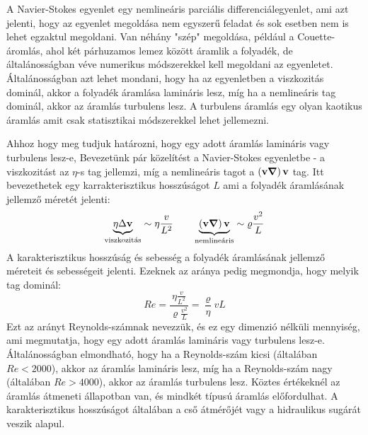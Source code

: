 \documentclass[../main.tex]{subfiles}
\begin{document}
A Navier-Stokes egyenlet egy nemlineáris parciális differenciálegyenlet, ami azt jelenti, hogy az egyenlet megoldása nem egyszerű feladat és sok esetben nem is lehet egzaktul megoldani.
Van néhány "szép" megoldása, például a Couette-áromlás, ahol két párhuzamos lemez között áramlik a folyadék, de általánosságban véve numerikus módszerekkel kell megoldani az egyenletet.
Általánosságban azt lehet mondani, hogy ha az egyenletben a viszkozitás dominál, akkor a folyadék áramlása lamináris lesz, míg ha a nemlineáris tag dominál, akkor az áramlás turbulens lesz.
A turbulens áramlás egy olyan kaotikus áramlás amit csak statisztikai módszerekkel lehet jellemezni. 

Ahhoz hogy meg tudjuk határozni, hogy egy adott áramlás lamináris vagy turbulens lesz-e,
Bevezetünk pár közelítést a Navier-Stokes egyenletbe - a viszkozitást az $\eta$-s tag jellemzi, míg a nemlineáris tagot a $\left(\bold{v} \boldsymbol{\nabla}\right)\bold{v}$ tag.
Itt bevezethetek egy karrakterisztikus hosszúságot $L$ ami a folyadék áramlásának jellemző méretét jelenti:
\begin{equation}
    \underbrace{\eta \Delta \bold{v}}_{\text{viszkozitás}} \sim \eta \frac{v}{L^2} \quad \quad \underbrace{\left(\bold{v} \boldsymbol{\nabla}\right)\bold{v}}_{\text{nemlineáris}} \sim \varrho \frac{v^2}{L}
\end{equation}
A karakterisztikus hosszúság és sebesség a folyadék áramlásának jellemző méreteit és sebességeit jelenti. Ezeknek az aránya pedig megmondja, hogy melyik tag dominál:
\begin{equation}
    Re = \frac{\eta \frac{v}{L^2}}{\varrho \frac{v^2}{L}} = \frac{\varrho}{\eta} v L
\end{equation}
Ezt az arányt Reynolds-számnak nevezzük, és ez egy dimenzió nélküli mennyiség, ami megmutatja, hogy egy adott áramlás lamináris vagy turbulens lesz-e.
Általánosságban elmondható, hogy ha a Reynolds-szám kicsi (általában $Re < 2000$), akkor az áramlás lamináris lesz, míg ha a Reynolds-szám nagy (általában $Re > 4000$), akkor az áramlás turbulens lesz.
Köztes értékeknél az áramlás átmeneti állapotban van, és mindkét típusú áramlás előfordulhat. A karakterisztikus hosszúságot általában a cső átmérőjét vagy a hidraulikus sugárát veszik alapul.
\end{document}
